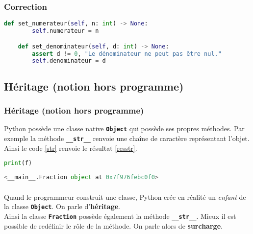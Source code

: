 \documentclass[svgnames,11pt]{beamer}
\begin{document}
\begin{frame}[fragile]
    \frametitle{Correction}

\begin{center}
\begin{lstlisting}[language=Python , basicstyle=\ttfamily\small, xleftmargin=2em, xrightmargin=1em]
    def set_numerateur(self, n: int) -> None:
        self.numerateur = n

    def set_denominateur(self, d: int) -> None:
        assert d != 0, "Le dénominateur ne peut pas être nul."
        self.denominateur = d
\end{lstlisting}
\end{center}

\end{frame}
\subsection{Héritage (notion hors programme)}
\begin{frame}[fragile]
    \frametitle{Héritage (notion hors programme)}
Python possède une classe native \textbf{\texttt{Object}} qui possède ses propres méthodes. Par exemple la méthode \textbf{\texttt{\_\_str\_\_}} renvoie une chaîne de caractère représentant l'objet. Ainsi le code \ref{str} renvoie le résultat \ref{resstr}.
\begin{center}
\begin{lstlisting}[language=Python , basicstyle=\ttfamily\small, xleftmargin=2em, xrightmargin=1em]
print(f)
\end{lstlisting}
\label{str}
\end{center}
\begin{center}
    \begin{lstlisting}[language=Python , basicstyle=\ttfamily\small, xleftmargin=2em, xrightmargin=1em]
<__main__.Fraction object at 0x7f976febc0f0>
\end{lstlisting}
    \label{resstr}
    \end{center}  

\end{frame}
\begin{frame}
    \frametitle{}

    Quand le programmeur construit une classe, Python crée en réalité un \emph{enfant} de la classe \textbf{\texttt{Object}}. On parle d'\textbf{héritage}.\\ Ainsi la classe \textbf{\texttt{Fraction}} possède également la méthode \textbf{\texttt{\_\_str\_\_}}. Mieux il est possible de redéfinir le rôle de la méthode. On parle alors de \textbf{surcharge}.

\end{frame}
\end{document}
